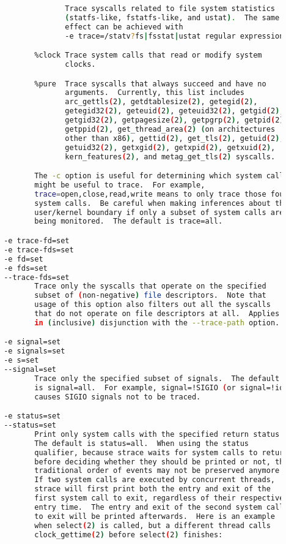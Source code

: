 {{\begin{lstlisting}[language=bash]
              %%statfs
                     Trace syscalls related to file system statistics
                     (statfs-like, fstatfs-like, and ustat).  The same
                     effect can be achieved with
                     -e trace=/statv?fs|fsstat|ustat regular expression.

              %clock Trace system calls that read or modify system
                     clocks.

              %pure  Trace syscalls that always succeed and have no
                     arguments.  Currently, this list includes
                     arc_gettls(2), getdtablesize(2), getegid(2),
                     getegid32(2), geteuid(2), geteuid32(2), getgid(2),
                     getgid32(2), getpagesize(2), getpgrp(2), getpid(2),
                     getppid(2), get_thread_area(2) (on architectures
                     other than x86), gettid(2), get_tls(2), getuid(2),
                     getuid32(2), getxgid(2), getxpid(2), getxuid(2),
                     kern_features(2), and metag_get_tls(2) syscalls.

              The -c option is useful for determining which system calls
              might be useful to trace.  For example,
              trace=open,close,read,write means to only trace those four
              system calls.  Be careful when making inferences about the
              user/kernel boundary if only a subset of system calls are
              being monitored.  The default is trace=all.

       -e trace-fd=set
       -e trace-fds=set
       -e fd=set
       -e fds=set
       --trace-fds=set
              Trace only the syscalls that operate on the specified
              subset of (non-negative) file descriptors.  Note that
              usage of this option also filters out all the syscalls
              that do not operate on file descriptors at all.  Applies
              in (inclusive) disjunction with the --trace-path option.

       -e signal=set
       -e signals=set
       -e s=set
       --signal=set
              Trace only the specified subset of signals.  The default
              is signal=all.  For example, signal=!SIGIO (or signal=!io)
              causes SIGIO signals not to be traced.

       -e status=set
       --status=set
              Print only system calls with the specified return status.
              The default is status=all.  When using the status
              qualifier, because strace waits for system calls to return
              before deciding whether they should be printed or not, the
              traditional order of events may not be preserved anymore.
              If two system calls are executed by concurrent threads,
              strace will first print both the entry and exit of the
              first system call to exit, regardless of their respective
              entry time.  The entry and exit of the second system call
              to exit will be printed afterwards.  Here is an example
              when select(2) is called, but a different thread calls
              clock_gettime(2) before select(2) finishes:


\end{lstlisting}}}
